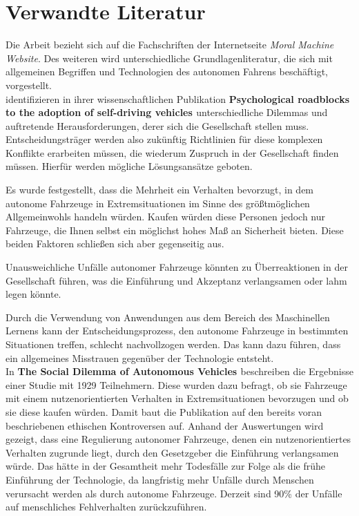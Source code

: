 \section{Verwandte Literatur}
\label{sec:verwandte-literatur}

Die Arbeit bezieht sich auf die Fachschriften der Internetseite \textit{Moral Machine Website}. Des weiteren wird unterschiedliche Grundlagenliteratur, die sich mit allgemeinen Begriffen und Technologien des autonomen Fahrens beschäftigt, vorgestellt.\\

\citeauthor{roadblocks} identifizieren in ihrer wissenschaftlichen Publikation \textbf{Psychological roadblocks to the adoption of self-driving vehicles \cite{roadblocks}} unterschiedliche Dilemmas und auftretende Herausforderungen, derer sich die Gesellschaft stellen muss. Entscheidungsträger werden also zukünftig Richtlinien für diese komplexen Konflikte erarbeiten müssen, die wiederum Zuspruch in der Gesellschaft finden müssen. Hierfür werden mögliche Lösungsansätze geboten. 

Es wurde festgestellt, dass die Mehrheit ein Verhalten bevorzugt, in dem  autonome Fahrzeuge in Extremsituationen im Sinne des größtmöglichen Allgemeinwohls handeln würden. Kaufen würden diese Personen jedoch nur Fahrzeuge, die Ihnen selbst ein möglichst hohes Maß an Sicherheit bieten. Diese beiden Faktoren schließen sich aber gegenseitig aus.

Unausweichliche Unfälle autonomer Fahrzeuge könnten zu Überreaktionen in der Gesellschaft führen, was die Einführung und Akzeptanz verlangsamen oder lahm legen könnte.

Durch die Verwendung von Anwendungen aus dem Bereich des Maschinellen Lernens kann der Entscheidungsprozess, den autonome Fahrzeuge in bestimmten Situationen treffen, schlecht nachvollzogen werden. Das kann dazu führen, dass ein allgemeines Misstrauen gegenüber der Technologie entsteht.\\

In \textbf{The Social Dilemma of Autonomous Vehicles \cite{socialDilemma}} beschreiben \citeauthor{socialDilemma} die Ergebnisse einer Studie mit 1929 Teilnehmern. Diese wurden dazu befragt, ob sie Fahrzeuge mit einem nutzenorientierten Verhalten in Extremsituationen bevorzugen und ob sie diese kaufen würden. Damit baut die Publikation auf den bereits voran beschriebenen ethischen Kontroversen \cite{roadblocks} auf. Anhand der Auswertungen wird gezeigt, dass eine Regulierung autonomer Fahrzeuge, denen ein nutzenorientiertes Verhalten zugrunde liegt, durch den Gesetzgeber die Einführung verlangsamen würde. Das hätte in der Gesamtheit mehr Todesfälle zur Folge als die frühe Einführung der Technologie, da langfristig mehr Unfälle durch Menschen verursacht werden als durch autonome Fahrzeuge. Derzeit sind 90\% der Unfälle auf menschliches Fehlverhalten zurückzuführen.\\

